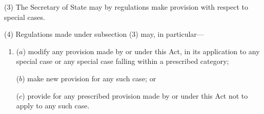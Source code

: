 \documentclass[a4paper]{article}
\begin{document}
(3)
The Secretary of State may by regulations make provision with respect to special cases.

(4) Regulations made under subsection (3) may, in particular---
\begin{enumerate}\item[]
($a$) modify any provision made by or under this Act, in its application to any
special case or any special case falling within a prescribed category;

($b$) make new provision for any such case; or

($c$) provide for any prescribed provision made by or under this Act not to
apply to any such case.
\end{enumerate}

\end{document}
